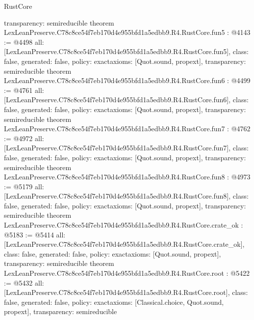 \begin{lexlean}{RustCore}
\begin{coremodule}
{  transparency: semireducible
}
theorem LexLeanPreserve.C78c8ce54f7eb170d4e955bfd1a5edbb9.R4.RustCore.fun5 : @4143 := @4498 {
  all: [LexLeanPreserve.C78c8ce54f7eb170d4e955bfd1a5edbb9.R4.RustCore.fun5],
  class: false,
  generated: false,
  policy: exact{axioms: [Quot.sound, propext]},
  transparency: semireducible
}
theorem LexLeanPreserve.C78c8ce54f7eb170d4e955bfd1a5edbb9.R4.RustCore.fun6 : @4499 := @4761 {
  all: [LexLeanPreserve.C78c8ce54f7eb170d4e955bfd1a5edbb9.R4.RustCore.fun6],
  class: false,
  generated: false,
  policy: exact{axioms: [Quot.sound, propext]},
  transparency: semireducible
}
theorem LexLeanPreserve.C78c8ce54f7eb170d4e955bfd1a5edbb9.R4.RustCore.fun7 : @4762 := @4972 {
  all: [LexLeanPreserve.C78c8ce54f7eb170d4e955bfd1a5edbb9.R4.RustCore.fun7],
  class: false,
  generated: false,
  policy: exact{axioms: [Quot.sound, propext]},
  transparency: semireducible
}
theorem LexLeanPreserve.C78c8ce54f7eb170d4e955bfd1a5edbb9.R4.RustCore.fun8 : @4973 := @5179 {
  all: [LexLeanPreserve.C78c8ce54f7eb170d4e955bfd1a5edbb9.R4.RustCore.fun8],
  class: false,
  generated: false,
  policy: exact{axioms: [Quot.sound, propext]},
  transparency: semireducible
}
theorem LexLeanPreserve.C78c8ce54f7eb170d4e955bfd1a5edbb9.R4.RustCore.crate_ok : @5183 := @5414 {
  all: [LexLeanPreserve.C78c8ce54f7eb170d4e955bfd1a5edbb9.R4.RustCore.crate_ok],
  class: false,
  generated: false,
  policy: exact{axioms: [Quot.sound, propext]},
  transparency: semireducible
}
theorem LexLeanPreserve.C78c8ce54f7eb170d4e955bfd1a5edbb9.R4.RustCore.root : @5422 := @5432 {
  all: [LexLeanPreserve.C78c8ce54f7eb170d4e955bfd1a5edbb9.R4.RustCore.root],
  class: false,
  generated: false,
  policy: exact{axioms: [Classical.choice, Quot.sound, propext]},
  transparency: semireducible
}


\end{coremodule}
\end{lexlean}

